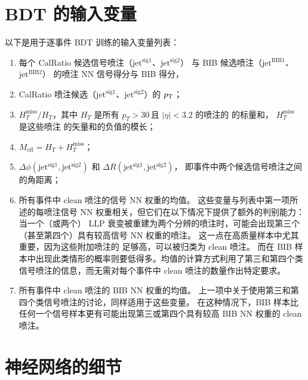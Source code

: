 \chapter{BDT 的输入变量}
\label{cpm:BDT}

以下是用于逐事件 BDT 训练的输入变量列表：

\begin{enumerate}
      \item 每个 CalRatio 候选信号喷注（$\text{jet}^{\text{sig}1}$、$\text{jet}^{\text{sig}2}$）
            与 BIB 候选喷注（$\text{jet}^{\text{BIB}1}$、$\text{jet}^{\text{BIB}2}$）
            的喷注 NN 信号得分与 BIB 得分，

      \item CalRatio 喷注候选（$\text{jet}^{\text{sig}1}$、$\text{jet}^{\text{sig}2}$）的 $p_{\text{T}}$；

      \item $H_T^{\text{miss}} / H_T$，其中 $H_T$ 是所有 $p_T > 30$\,\GeV 且 $|\eta| < 3.2$ 的喷注的 \pt 的标量和，
            $H_T^{\text{miss}}$ 是这些喷注 \pt 的矢量和的负值的模长；

      \item $M_{\text{eff}} = H_T + H_T^{\text{miss}} $；

      \item $\Delta \phi (\text{jet}^{\text{sig}1}, \text{jet}^{\text{sig}2})$ 和
            $\Delta R(\text{jet}^{\text{sig}1}, \text{jet}^{\text{sig}2})$，
            即事件中两个候选信号喷注之间的角距离；

      \item 所有事件中 clean 喷注的信号 NN 权重的均值。
            这些变量与列表中第一项所述的每喷注信号 NN 权重相关，但它们在以下情况下提供了额外的判别能力：
            当一个（或两个） LLP 衰变被重建为两个分辨的喷注时，可能会出现第三个（甚至第四个）具有较高信号 NN 权重的喷注。
            这一点在高质量样本中尤其重要，因为这些附加喷注的 \pt 足够高，可以被归类为 clean 喷注。
            而在 BIB 样本中出现此类情形的概率则要低得多。均值的计算方式利用了第三和第四个类信号喷注的信息，而无需对每个事件中 clean 喷注的数量作出特定要求。

      \item 所有事件中 clean 喷注的 BIB NN 权重的均值。
            上一项中关于使用第三和第四个类信号喷注的讨论，同样适用于这些变量。
            在这种情况下，BIB 样本比任何一个信号样本更有可能出现第三或第四个具有较高 BIB NN 权重的 clean 喷注。
\end{enumerate}


\chapter{神经网络的细节}
